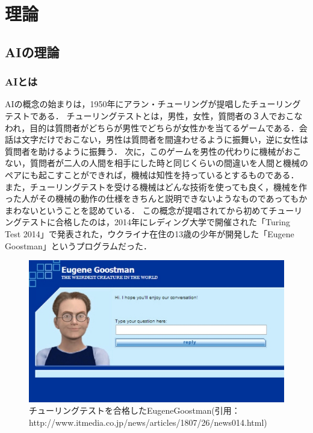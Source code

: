 \chapter{理論}
\section{AIの理論}
\subsection{AIとは}
AIの概念の始まりは，1950年にアラン・チューリングが提唱したチューリングテストである．\cite{ronbun1}
チューリングテストとは，男性，女性，質問者の３人でおこなわれ，目的は質問者がどちらが男性でどちらが女性かを当てるゲームである．会話は文字だけでおこない，男性は質問者を間違わせるように振舞い，逆に女性は質問者を助けるように振舞う．
次に，このゲームを男性の代わりに機械がおこない，質問者が二人の人間を相手にした時と同じくらいの間違いを人間と機械のペアにも起こすことができれば，機械は知性を持っているとするものである．
また，チューリングテストを受ける機械はどんな技術を使っても良く，機械を作った人がその機械の動作の仕様をきちんと説明できないようなものであってもかまわないということを認めている．
この概念が提唱されてから初めてチューリングテストに合格したのは，2014年にレディング大学で開催された「Turing Test 2014」で発表された，ウクライナ在住の13歳の少年が開発した「Eugene Goostman」というプログラムだった．\\
\begin{figure}[!ht]
    \begin{screen}
    \begin{center}
        \includegraphics[scale=0.55, clip]{./img/Eugene_Goostman.jpg}
        \caption{チューリングテストを合格したEugeneGoostman\newline(引用：http://www.itmedia.co.jp/news/articles/1807/26/news014.html)}
        \label{fig:チューリングテストを合格したEugeneGoostman}
    \end{center}
\end{screen}
\end{figure}
